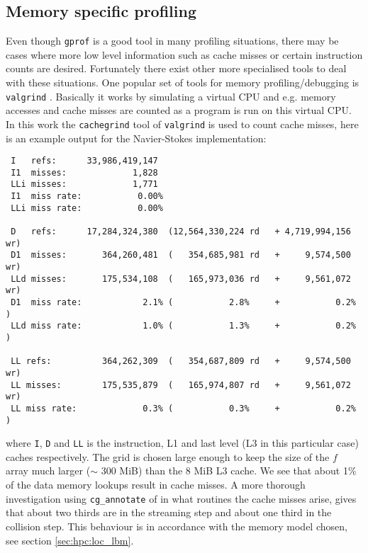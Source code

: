 \subsection{Memory specific profiling}
Even though \texttt{gprof} is a good tool in many profiling
situations, there may be cases where more low level information such
as cache misses or certain instruction counts are desired. Fortunately
there exist other more specialised tools to deal with these
situations. One popular set of tools for memory profiling/debugging is
\texttt{valgrind} \cite{valgrind}. Basically it works by simulating a
virtual CPU and e.g. memory accesses and cache misses are counted as a
program is run on this virtual CPU. In this work the
\texttt{cachegrind} tool of \texttt{valgrind} is used to count cache
misses, here is an example output for the Navier-Stokes
implementation:

\begin{verbatim} 
 I   refs:      33,986,419,147
 I1  misses:             1,828
 LLi misses:             1,771
 I1  miss rate:           0.00%
 LLi miss rate:           0.00%
 
 D   refs:      17,284,324,380  (12,564,330,224 rd   + 4,719,994,156 wr)
 D1  misses:       364,260,481  (   354,685,981 rd   +     9,574,500 wr)
 LLd misses:       175,534,108  (   165,973,036 rd   +     9,561,072 wr)
 D1  miss rate:            2.1% (           2.8%     +           0.2%  )
 LLd miss rate:            1.0% (           1.3%     +           0.2%  )
 
 LL refs:          364,262,309  (   354,687,809 rd   +     9,574,500 wr)
 LL misses:        175,535,879  (   165,974,807 rd   +     9,561,072 wr)
 LL miss rate:             0.3% (           0.3%     +           0.2%  )
\end{verbatim}
where \texttt{I}, \texttt{D} and \texttt{LL} is the instruction, L1
and last level (L3 in this particular case) caches respectively. The
grid is chosen large enough to keep the size of the $f$ array much
larger ($\sim$ 300 MiB) than the 8 MiB L3 cache. We see that about 1\%
of the data memory lookups result in cache misses. A more thorough
investigation using \texttt{cg\_annotate} of in what routines the
cache misses arise, gives that about two thirds are in the streaming
step and about one third in the collision step. This behaviour is in
accordance with the memory model chosen, see section
\ref{sec:hpc:loc_lbm}.

